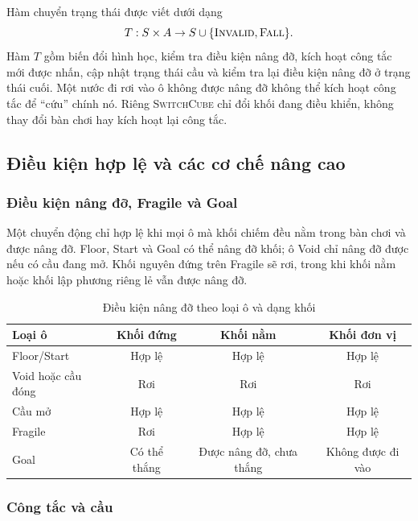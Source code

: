 Hàm chuyển trạng thái được viết dưới dạng
\begin{equation}
T:S\times A\rightarrow S\cup\{\textsc{Invalid},\textsc{Fall}\}.
\end{equation}
Hàm $T$ gồm biến đổi hình học, kiểm tra điều kiện nâng đỡ, kích hoạt công tắc
mới được nhấn, cập nhật trạng thái cầu và kiểm tra lại điều kiện nâng đỡ ở
trạng thái cuối. Một nước đi rơi vào ô không được nâng đỡ không thể kích hoạt
công tắc để ``cứu'' chính nó. Riêng \textsc{SwitchCube} chỉ đổi khối đang điều
khiển, không thay đổi bàn chơi hay kích hoạt lại công tắc.

\subsection{Điều kiện hợp lệ và các cơ chế nâng cao}

\subsubsection{Điều kiện nâng đỡ, Fragile và Goal}

Một chuyển động chỉ hợp lệ khi mọi ô mà khối chiếm đều nằm trong bàn chơi và
được nâng đỡ. Floor, Start và Goal có thể nâng đỡ khối; ô Void chỉ nâng đỡ
được nếu có cầu đang mở. Khối nguyên đứng trên Fragile sẽ rơi, trong khi khối
nằm hoặc khối lập phương riêng lẻ vẫn được nâng đỡ.

\begin{table}[H]
\centering
\caption{Điều kiện nâng đỡ theo loại ô và dạng khối}
\label{tab:support-rules}
\small
\begin{tabular}{@{}lccc@{}}
\toprule
\textbf{Loại ô} & \textbf{Khối đứng} & \textbf{Khối nằm} & \textbf{Khối đơn vị} \\
\midrule
Floor/Start & Hợp lệ & Hợp lệ & Hợp lệ \\
Void hoặc cầu đóng & Rơi & Rơi & Rơi \\
Cầu mở & Hợp lệ & Hợp lệ & Hợp lệ \\
Fragile & Rơi & Hợp lệ & Hợp lệ \\
Goal & Có thể thắng & Được nâng đỡ, chưa thắng & Không được đi vào \\
\bottomrule
\end{tabular}
\end{table}

\subsubsection{Công tắc và cầu}

